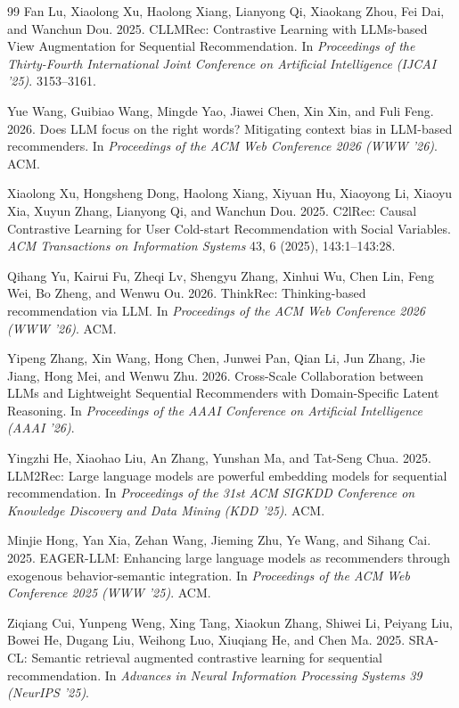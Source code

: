 ﻿\documentclass{article}
\begin{document}
\begin{thebibliography}{99}
Fan Lu, Xiaolong Xu, Haolong Xiang, Lianyong Qi, Xiaokang Zhou, Fei Dai, and Wanchun Dou. 2025.
CLLMRec: Contrastive Learning with LLMs-based View Augmentation for Sequential Recommendation.
In \textit{Proceedings of the Thirty-Fourth International Joint Conference on Artificial Intelligence (IJCAI '25)}. 3153--3161.

Yue Wang, Guibiao Wang, Mingde Yao, Jiawei Chen, Xin Xin, and Fuli Feng. 2026.
Does LLM focus on the right words? Mitigating context bias in LLM-based recommenders.
In \textit{Proceedings of the ACM Web Conference 2026 (WWW '26)}. ACM.

\vspace{-0.45em}

Xiaolong Xu, Hongsheng Dong, Haolong Xiang, Xiyuan Hu, Xiaoyong Li, Xiaoyu Xia, Xuyun Zhang, Lianyong Qi, and Wanchun Dou. 2025.
C2lRec: Causal Contrastive Learning for User Cold-start Recommendation with Social Variables.
\textit{ACM Transactions on Information Systems} 43, 6 (2025), 143:1--143:28.

Qihang Yu, Kairui Fu, Zheqi Lv, Shengyu Zhang, Xinhui Wu, Chen Lin, Feng Wei, Bo Zheng, and Wenwu Ou. 2026.
ThinkRec: Thinking-based recommendation via LLM.
In \textit{Proceedings of the ACM Web Conference 2026 (WWW '26)}. ACM.

Yipeng Zhang, Xin Wang, Hong Chen, Junwei Pan, Qian Li, Jun Zhang, Jie Jiang, Hong Mei, and Wenwu Zhu. 2026.
Cross-Scale Collaboration between LLMs and Lightweight Sequential Recommenders with Domain-Specific Latent Reasoning.
In \textit{Proceedings of the AAAI Conference on Artificial Intelligence (AAAI '26)}.

Yingzhi He, Xiaohao Liu, An Zhang, Yunshan Ma, and Tat-Seng Chua. 2025.
LLM2Rec: Large language models are powerful embedding models for sequential recommendation.
In \textit{Proceedings of the 31st ACM SIGKDD Conference on Knowledge Discovery and Data Mining (KDD '25)}. ACM.

Minjie Hong, Yan Xia, Zehan Wang, Jieming Zhu, Ye Wang, and Sihang Cai. 2025.
EAGER-LLM: Enhancing large language models as recommenders through exogenous behavior-semantic integration.
In \textit{Proceedings of the ACM Web Conference 2025 (WWW '25)}. ACM.

Ziqiang Cui, Yunpeng Weng, Xing Tang, Xiaokun Zhang, Shiwei Li, Peiyang Liu, Bowei He, Dugang Liu, Weihong Luo, Xiuqiang He, and Chen Ma. 2025.
SRA-CL: Semantic retrieval augmented contrastive learning for sequential recommendation.
In \textit{Advances in Neural Information Processing Systems 39 (NeurIPS '25)}.


\end{thebibliography}
\end{document}
